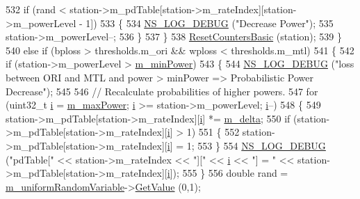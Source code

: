 \begin{DoxyCode}
532           \textcolor{keywordflow}{if} (rand < station->m\_pdTable[station->m\_rateIndex][station->m\_powerLevel - 1])
533             \{
534               \hyperlink{group__logging_ga413f1886406d49f59a6a0a89b77b4d0a}{NS\_LOG\_DEBUG} (\textcolor{stringliteral}{"Decrease Power"});
535               station->m\_powerLevel--;
536             \}
537         \}
538       \hyperlink{classns3_1_1RrpaaWifiManager_a09b0daa8aa5414f393f6b8fb2a3043ca}{ResetCountersBasic} (station);
539     \}
540   \textcolor{keywordflow}{else} \textcolor{keywordflow}{if} (bploss > thresholds.m\_ori && wploss < thresholds.m\_mtl)
541     \{
542       \textcolor{keywordflow}{if} (station->m\_powerLevel > \hyperlink{classns3_1_1RrpaaWifiManager_a2df897d246e52f36e94520c70a9026ab}{m\_minPower})
543         \{
544           \hyperlink{group__logging_ga413f1886406d49f59a6a0a89b77b4d0a}{NS\_LOG\_DEBUG} (\textcolor{stringliteral}{"loss between ORI and MTL and power > minPower => Probabilistic Power
       Decrease"});
545 
546           \textcolor{comment}{// Recalculate probabilities of higher powers.}
547           \textcolor{keywordflow}{for} (uint32\_t \hyperlink{bernuolliDistribution_8m_a6f6ccfcf58b31cb6412107d9d5281426}{i} = \hyperlink{classns3_1_1RrpaaWifiManager_a8f5659ec5d99c385dcde039364b0ec8a}{m\_maxPower}; \hyperlink{bernuolliDistribution_8m_a6f6ccfcf58b31cb6412107d9d5281426}{i} >= station->m\_powerLevel; 
      \hyperlink{bernuolliDistribution_8m_a6f6ccfcf58b31cb6412107d9d5281426}{i}--)
548             \{
549               station->m\_pdTable[station->m\_rateIndex][\hyperlink{bernuolliDistribution_8m_a6f6ccfcf58b31cb6412107d9d5281426}{i}] *= \hyperlink{classns3_1_1RrpaaWifiManager_aca7d4b5e9e8758b935433bc5c9ad24af}{m\_delta};
550               \textcolor{keywordflow}{if} (station->m\_pdTable[station->m\_rateIndex][\hyperlink{bernuolliDistribution_8m_a6f6ccfcf58b31cb6412107d9d5281426}{i}] > 1)
551                 \{
552                   station->m\_pdTable[station->m\_rateIndex][\hyperlink{bernuolliDistribution_8m_a6f6ccfcf58b31cb6412107d9d5281426}{i}] = 1;
553                 \}
554               \hyperlink{group__logging_ga413f1886406d49f59a6a0a89b77b4d0a}{NS\_LOG\_DEBUG} (\textcolor{stringliteral}{"pdTable["} << station->m\_rateIndex << \textcolor{stringliteral}{"]["} << 
      \hyperlink{bernuolliDistribution_8m_a6f6ccfcf58b31cb6412107d9d5281426}{i} << \textcolor{stringliteral}{"] = "} << station->m\_pdTable[station->m\_rateIndex][\hyperlink{bernuolliDistribution_8m_a6f6ccfcf58b31cb6412107d9d5281426}{i}]);
555             \}
556           \textcolor{keywordtype}{double} rand = \hyperlink{classns3_1_1RrpaaWifiManager_a04e94944516bbae00d3873065258aaad}{m\_uniformRandomVariable}->\hyperlink{classns3_1_1UniformRandomVariable_a03822d8c86ac51e9aa83bbc73041386b}{GetValue} (0,1);

\end{DoxyCode}
